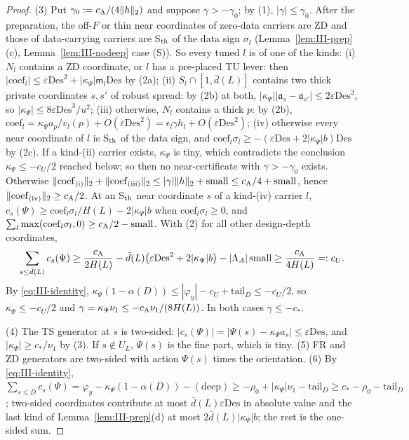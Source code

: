 \documentclass[10pt]{amsart}
\theoremstyle{definition}
\theoremstyle{remark}
\begin{document}
\begin{proof}
(3) Put $\gamma_0:=c_{\rm A}/(4\|h\|_2)$ and suppose $\gamma>-\gamma_0$; by (1),
$|\gamma|\le\gamma_0$.  After the preparation, the off-$F$ or thin near
coordinates of zero-data carriers are ZD and those of data-carrying carriers
are S$_{\rm th}$ of the data sign $\sigma_l$ (Lemma~\ref{lem:III-prep}(c),
Lemma~\ref{lem:III-nodeep} case (S)).  So every tuned $l$ is of one of the kinds:
(i) $N_l$ contains a ZD coordinate, or $l$ has a pre-placed TU lever: then
$|\mathrm{coef}_l|\le\varepsilon\mathrm{Des}^2+|\kappa_\Psi|\mathsf m_l\mathrm{Des}$
by (2a); (ii) $S_l\cap[1,\bar d(L)]$ contains two thick private coordinates
$s,s'$ of robust spread: by (2b) at both, $|\kappa_\Psi||\mathfrak a_s-\mathfrak a_{s'}|
\le2\varepsilon\mathrm{Des}^2$, so $|\kappa_\Psi|\le8\varepsilon\mathrm{Des}^3/u^2$;
(iii) otherwise, $N_l$ contains a thick $p$: by (2b), $\mathrm{coef}_l=\kappa_\Psi
a_p/v_l(p)+O(\varepsilon\mathrm{Des}^2)=\epsilon_l\gamma h_l+O(\varepsilon
\mathrm{Des}^2)$; (iv) otherwise every near coordinate of $l$ is S$_{\rm th}$ of
the data sign, and $\mathrm{coef}_l\sigma_l\ge-(\varepsilon\mathrm{Des}+2|\kappa_\Psi|
b)\mathrm{Des}$ by (2c).  If a kind-(ii) carrier exists, $\kappa_\Psi$ is tiny,
which contradicts the conclusion $\kappa_\Psi\le-c_U/2$ reached below; so then no
near-certificate with $\gamma>-\gamma_0$ exists.  Otherwise
$\|\mathrm{coef}_{\rm (i)}\|_2+\|\mathrm{coef}_{\rm (iii)}\|_2\le|\gamma|\|h\|_2+
\mathrm{small}\le c_{\rm A}/4+\mathrm{small}$, hence $\|\mathrm{coef}_{\rm (iv)}\|_2\ge
c_{\rm A}/2$.  At an S$_{\rm th}$ near coordinate $s$ of a kind-(iv) carrier $l$,
$c_s(\Psi)\ge\mathrm{coef}_l\sigma_l/H(L)-2|\kappa_\Psi|b$ when $\mathrm{coef}_l
\sigma_l\ge0$, and $\sum_l\max(\mathrm{coef}_l\sigma_l,0)\ge c_{\rm A}/2-\mathrm{small}$.
With (2) for all other design-depth coordinates,
\[
 \sum_{s\le\bar d(L)}c_s(\Psi)\ge\frac{c_{\rm A}}{2H(L)}-\bar d(L)\big(\varepsilon
 \mathrm{Des}^2+2|\kappa_\Psi|b\big)-|\Lambda_A|\,\mathrm{small}\ge\frac{c_{\rm A}}{4H(L)}
 =:c_U .
\]
By \eqref{eq:III-identity}, $\kappa_\Psi(1-\alpha(D))\le|\varphi_y|-c_U+
\mathrm{tail}_D\le-c_U/2$, so $\kappa_\Psi\le-c_U/2$ and $\gamma=\kappa_\Psi\nu_1
\le-c_{\rm A}\nu_1/(8H(L))$.  In both cases $\gamma\le-c_*$.

(4) The TS generator at $s$ is two-sided: $|c_s(\Psi)|=|\Psi(s)-\kappa_\Psi a_s|\le
\varepsilon\mathrm{Des}$, and $|\kappa_\Psi|\ge c_*/\nu_1$ by (3).  If $s\notin U_L$,
$\Psi(s)$ is the fine part, which is tiny.  (5) FR and ZD generators are
two-sided with action $\Psi(s)$ times the orientation.  (6) By
\eqref{eq:III-identity}, $\sum_{s\le D}c_s(\Psi)=\varphi_y-\kappa_\Psi(1-\alpha(D))-
(\text{deep})\ge-\rho_0+|\kappa_\Psi|\nu_1-\mathrm{tail}_D\ge c_*-\rho_0-
\mathrm{tail}_D$; two-sided coordinates contribute at most $\bar d(L)\varepsilon
\mathrm{Des}$ in absolute value and the last kind of
Lemma~\ref{lem:III-prep}(d) at most $2\bar d(L)|\kappa_\Psi|b$; the rest is the
one-sided sum.
\end{proof}
\end{document}
